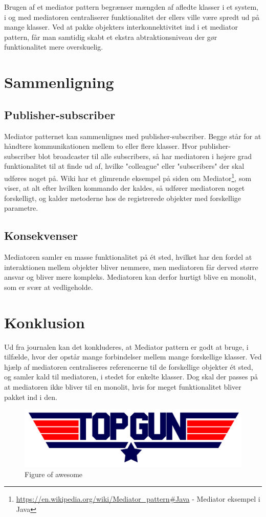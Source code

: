 Brugen af et mediator pattern begrænser mængden af afledte klasser i et system, i og med mediatoren centraliserer funktionalitet der ellers ville være spredt ud på mange klasser. Ved at pakke objekters interkonnektivitet ind i et mediator pattern, får man samtidig skabt et ekstra abtraktionsniveau der gør funktionalitet mere overskuelig.



\section{Sammenligning}

\subsection{Publisher-subscriber}
Mediator patternet kan sammenlignes med publisher-subscriber. Begge står for at håndtere kommunikationen mellem to eller flere klasser. Hvor publisher-subscriber blot broadcaster til alle subscribers, så har mediatoren i højere grad funktionalitet til at finde ud af, hvilke "colleague" eller "subscribers" der skal udføres noget på. Wiki har et glimrende eksempel på siden om Mediator\footnote{\url{https://en.wikipedia.org/wiki/Mediator_pattern#Java} - Mediator eksempel i Java}, som viser, at alt efter hvilken kommando der kaldes, så udfører mediatoren noget forskelligt, og kalder metoderne hos de registrerede objekter med forskellige parametre.

\subsection{Konsekvenser}
Mediatoren samler en masse funktionalitet på ét sted, hvilket har den fordel at interaktionen mellem objekter bliver nemmere, men mediatoren får derved større ansvar og bliver mere kompleks. Mediatoren kan derfor hurtigt blive en monolit, som er svær at vedligeholde.

\section{Konklusion}
Ud fra journalen kan det konkluderes, at Mediator pattern er godt at bruge, i tilfælde, hvor der opstår mange forbindelser mellem mange forskellige klasser. Ved hjælp af mediatoren centraliseres referencerne til de forskellige objekter ét sted, og samler kald til mediatoren, i stedet for enkelte klasser. Dog skal der passes på at mediatoren ikke bliver til en monolit, hvis for meget funktionalitet bliver pakket ind i den.

\begin{figure}[h]
	\centering
	\includegraphics[width=1\linewidth]{figs/topgunn}
	\caption{Figure of awesome}
	\label{fig:topgunn}
\end{figure}

